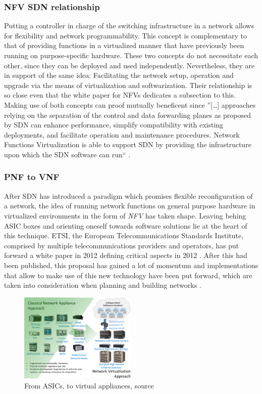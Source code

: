 \subsubsection{NFV SDN relationship}
Putting a controller in charge of the switching infrastructure in a network allows for flexibility and network programmability. This concept is complementary to that of providing functions in a virtualized manner that have previously been running on purpose-specific hardware. These two concepts do not necessitate each other, since they can be deployed and used independently. Nevertheless, they are in support of the same idea: Facilitating the network setup, operation and upgrade via the means of virtualization and softwarization. Their relationship is so close even that the white paper for NFVs dedicates a subsection to this. Making use of both concepts can proof mutually beneficent since ''[\dots] approaches relying on the separation of the control and data forwarding planes as proposed by SDN can enhance performance, simplify compatibility with existing deployments, and facilitate operation and maintenance procedures. Network Functions Virtualization is able to support SDN by providing the infrastructure upon which the SDN software can run`` \cite{nfv_wp}. 


\subsubsection{PNF to VNF}
After SDN has introduced a paradigm which promises flexible reconfiguration of a network, the idea of running network functions on general purpose hardware in virtualized environments in the form of \textit{NFV} has taken shape. Leaving behing ASIC boxes and orienting oneself towards software solutions lie at the heart of this technique. ETSI, the European Telecommunications Standards Institute, comprised by multiple telecommunications providers and operators, has put forward a white paper in 2012 defining critical aspects in 2012 \cite{nfv_wp}. After this had been published, this proposal has gained a lot of momentum and implementations that allow to make use of this new technology have been put forward, which are taken into consideration when planning and building networks \cite{ordonez2017network}.

\begin{figure}[H]
	\centering
	\includegraphics[width=0.5\textwidth]{images/nfv.png}
	\caption{From ASICs, to virtual appliances, source \cite{nfv_wp}}
	\label{img:nfv_wp}
\end{figure}

